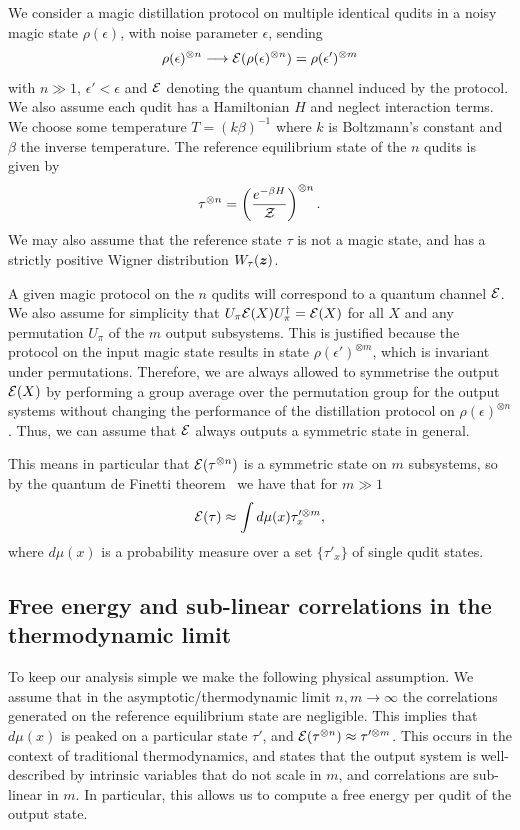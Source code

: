 \documentclass[pra,
aps,
twocolumn,
superscriptaddress,
groupedaddress,
nofootinbib,
reprint
]{revtex4-1}
\begin{document}
We consider a magic distillation protocol on multiple identical qudits in a noisy magic state $\rho(\epsilon)$, with noise parameter $\epsilon$, sending 
\begin{equation}
\rho(\epsilon)^{\otimes n} \longrightarrow {\mathcal E}(\rho(\epsilon)^{\otimes n}) =\rho(\epsilon')^{\otimes m}
\end{equation}
with $n \gg 1$, $\epsilon' <\epsilon$ and ${\mathcal E}$ denoting the quantum channel induced by the protocol. We also assume each qudit has a Hamiltonian $H$ and neglect interaction terms. We choose some temperature $T = (k\beta)^{-1}$ where $k$ is Boltzmann's constant and $\beta$ the inverse temperature. The reference equilibrium state of the $n$ qudits is given by
\begin{equation}
\tau^{\otimes n} = \left ( \frac{e^{-\beta H}}{\mathcal{Z}} \right )  ^{\otimes n}.
\end{equation}
We may also assume that the reference state $\tau$ is not a magic state, and has a strictly positive Wigner distribution $W_\tau(\bm{z})$.

A given magic protocol on the $n$ qudits will correspond to a quantum channel ${\mathcal E}$. We also assume for simplicity that $U_\pi{\mathcal E}(X) U_\pi^\dagger = {\mathcal E}(X)$ for all $X$ and any permutation $U_\pi$ of the $m$ output subsystems. This is justified because the protocol on the input magic state results in state $\rho(\epsilon')^{\otimes m}$, which is invariant under permutations. Therefore, we are always allowed to symmetrise the output ${\mathcal E}(X)$ by performing a group average over the permutation group for the output systems without changing the performance of the distillation protocol on $\rho(\epsilon)^{\otimes n}$. Thus, we can assume that ${\mathcal E}$ always outputs a symmetric state in general.

This means in particular that ${\mathcal E}(\tau^{\otimes n})$ is a symmetric state on $m$ subsystems, so by the quantum de Finetti theorem~\cite{hudson_locally_1976, christandl_2007} we have that for $m \gg 1$
\begin{equation}
{\mathcal E}(\tau) \approx \int d\mu(x) \tau_x^{\prime \otimes m},
\end{equation}
where $d\mu(x)$ is a probability measure over a set $\{\tau'_x\}$ of single qudit states.

\subsection{Free energy and sub-linear correlations in the thermodynamic limit}
To keep our analysis simple we make the following physical assumption. We assume that in the asymptotic/thermodynamic limit $n,m \rightarrow \infty$ the correlations generated on the reference equilibrium state are negligible. This implies that $d\mu(x)$ is peaked on a particular state $\tau'$, and ${\mathcal E}(\tau^{\otimes n}) \approx \tau'^{\otimes m}$. This occurs in the context of traditional thermodynamics, and states that the output system is well-described by intrinsic variables that do not scale in $m$, and correlations are sub-linear in $m$. In particular, this allows us to compute a free energy per qudit of the output state. 
\end{document}
